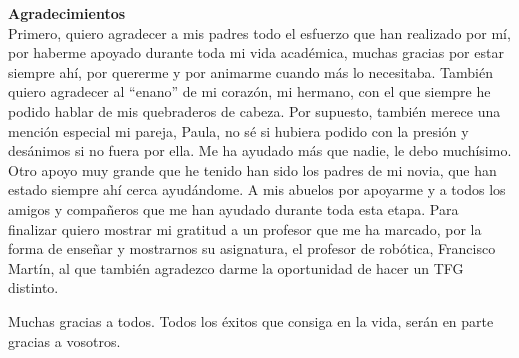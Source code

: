\documentclass[twoside,a4paper,12pt,openany]{book}
\begin{document}
\clearpage
\newpage{\pagestyle{empty}\cleardoublepage}
\thispagestyle{empty}

\vspace{5cm}
\textbf{\huge{Agradecimientos}}\\

Primero, quiero agradecer a mis padres todo el esfuerzo que han realizado por mí, por haberme apoyado durante toda mi vida académica, muchas gracias por estar siempre ahí, por quererme y por animarme cuando más lo necesitaba.
También quiero agradecer al ``enano'' de mi corazón, mi hermano, con el que siempre he podido hablar de mis quebraderos de cabeza.
Por supuesto, también merece una mención especial mi pareja, Paula, no sé si hubiera podido con la presión y desánimos si no fuera por ella. Me ha ayudado más que nadie, le debo muchísimo.
Otro apoyo muy grande que he tenido han sido los padres de mi novia, que han estado siempre ahí cerca ayudándome.
A mis abuelos por apoyarme y a todos los amigos y compañeros que me han ayudado durante toda esta etapa.
Para finalizar quiero mostrar mi gratitud a un profesor que me ha marcado, por la forma de enseñar y mostrarnos su asignatura, el profesor de robótica, Francisco Martín, al que también agradezco darme la oportunidad de hacer un TFG distinto.

Muchas gracias a todos. Todos los éxitos que consiga en la vida, serán en parte gracias a vosotros.

\clearpage
\newpage{\pagestyle{empty}\cleardoublepage}

\newpage{\pagestyle{empty}\cleardoublepage} 
%


\frontmatter
\tableofcontents

\listoffigures

\mainmatter

\setcounter{page}{1}
















\end{document}
